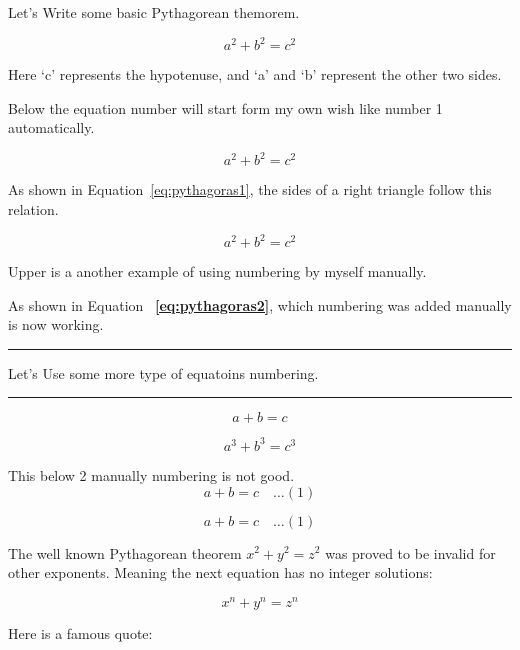 \documentclass[12pt, letterpaper]{article}
\begin{document}
Let's Write some basic Pythagorean themorem.

$$ a^2 + b^2 = c^2 $$

Here `c' represents the hypotenuse, and `a' and `b' represent the other two sides. 


Below the equation number will start form my own wish like number 1 automatically.

\setcounter{equation}{0}  %

\begin{equation}
    a^2 + b^2 = c^2
    \label{eq:pythagoras1}
\end{equation}


As shown in Equation~\ref{eq:pythagoras1}, the sides of a right triangle follow this relation.


\begin{equation}
    a^2 + b^2 = c^2 
    \tag{Rana 1}
    \label{eq:pythagoras2}
\end{equation}

Upper is a another example of using numbering by myself manually.

As shown in Equation~ \textbf{\ref{eq:pythagoras2}}, which numbering was added manually is now working.



\noindent\rule{\linewidth}{5pt}
\begin{center}
Let's Use some more type of equatoins numbering.
\end{center}
\noindent\rule{\linewidth}{5pt}


\begin{equation}
    a + b = c \tag{000}
\end{equation}


\begin{equation}
    a^3 + b^3 = c^3
    \label{eq:pythagoras3}
\end{equation}


This below 2 manually numbering is not good.
\[
a + b = c \quad \ldots (1)
\]

$$
a + b = c \quad \ldots (1)
$$



\newpage


The well known Pythagorean theorem \(x^2 + y^2 = z^2\) was 
proved to be invalid for other exponents. 
Meaning the next equation has no integer solutions:

\[ x^n + y^n = z^n \]


Here is a famous quote:
\end{document}
